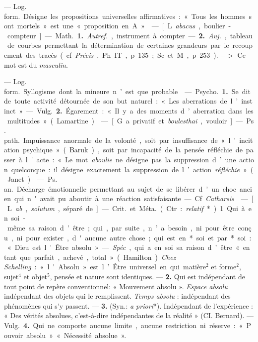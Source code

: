 
	\begin{itemize}[leftmargin=1cm, label=, itemsep=1pt]

 — \si{Log. form.} Désigne les propositions universelles
affirmatives :
« Tous les hommes sont mortels »
est une « proposition en A ».

 — [L. {\it abacus}, boulier-compteur]
— \si{Math.} {\bf 1.} {\it Autref.}, instrument
à compter. — {\bf 2.} {\it Auj.}, tableau
de courbes permettant la détermination
de certaines grandeurs par
le recoupement des tracés (cf. {\it Précis},
Ph. IT, p. 135; Sc. et M., p. 253).
$->$ Ce mot est du {\it masculin}.

 — \si{Log. form.} Syllogisme
dont la mineure n’est que probable.

 — \si{Psycho.} {\bf 1.} Se dit de
toute activité détournée de son but
naturel : « Les aberrations de l’instinct ».
— \si{Vulg.} {\bf 2.} Égarement : « Il
y a des moments d’aberration dans
les multitudes » (Lamartine).

 — [G. a privatif et {\it boulesthai},
vouloir] — \si{Ps. path.} Impuissance
anormale de la volonté, soit par
insuffisance de « l'incitation psychique »
(Baruk), soit par incapacité
de la pensée réfléchie de passer à
l'acte : « Le mot {\it aboulie} ne désigne
pas la suppression d’une action quelconque :
il désigne exactement la
suppression de l’action {\it réfléchie} »
(Janet).

 — \si{Ps. an.} Décharge émotionnelle
permettant au sujet de se
libérer d’un choc ancien qui n'avait
pu aboutir à une réaction satisfaisante.
— Cf. {\it Catharsis}.

 — [L {\it ab}, {\it solutum}, séparé de]
— \si{Crit.} et \si{Méta.} (Ctr. : {\it relatif}*).
1. Qui à en soi-même sa raison
d’être; qui, par suite, n’a besoin, ni
pour être conçu, ni pour exister,
d'aucune autre chose; qui est en*
soi et par* soi : « Dieu est l'Être
absolu ». — {\it Spéc}., qui a en soi sa
raison d’être « en tant que parfait,
achevé, total » (Hamilton). {\it Chez
Schelling} : « l'Absolu » est l’Être
universel en qui matière$^2$ et forme$^2$,
sujet$^4$ et objet$^5$, pensée et nature
sont identiques. — {\bf 2.} Qui est indépendant
de tout point de repère
conventionnel: « Mouvement absolu ».
{\it Espace absolu} indépendant des
objets qui le remplissent. {\it Temps
absolu} : indépendant des phénomènes
qui s’y passent. — {\bf 3.} (Syn.: {\it a priori}*).
Indépendant de l'expérience : « Des
vérités absolues, c’est-à-dire indépendantes
de la réalité » (CI. Bernard).
— \si{Vulg.} {\bf 4.} Qui ne comporte
aucune limite, aucune restriction
ni réserve : « Pouvoir absolu »
« Nécessité absolue ».


\end{itemize}
